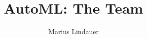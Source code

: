 




\title[AutoML: The Team]{AutoML: The Team}
\author{Marius Lindauer}
\institute{}
\date{}





	
	\maketitle
	

